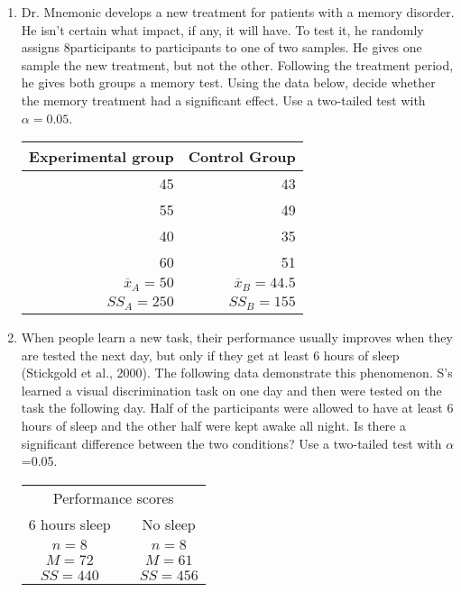 \documentclass[12pt]{article}%
\begin{document}
\mbox{}
\large
\begin{enumerate}

 \item Dr. Mnemonic develops a new treatment for patients with a memory disorder. He isn't certain what impact, if any, it will have. To test it, he randomly assigns 8participants to participants to one of two samples.  He gives one sample the new treatment, but not the other.  Following the treatment period, he gives both groups a memory test.  Using the data below, decide whether the memory treatment had a significant effect. Use a two-tailed test with $\alpha=0.05$.

\begin{table}[h!]
\begin{center}
\begin{tabular}{rr}
Experimental group & Control Group\\
\hline
45 & 43\\
55 & 49\\
40 & 35\\
60 & 51\\
\hline
$\overline{x}_{A}=50$ & $\overline{x}_B=44.5$\\
$SS_A=250$ & $SS_B=155$\\
\end{tabular}
\end{center}
\end{table}

\newpage

\item When people learn a new task, their performance usually improves when they are tested the next day, but only if they get at least 6 hours of sleep (Stickgold et al., 2000).  The following data demonstrate this phenomenon.  S's learned a visual discrimination task on one day and then were tested on the task the following day.  Half of the participants were allowed to have at least 6 hours of sleep and the other half were kept awake all night.  Is there a significant difference between the two conditions?  Use a two-tailed test with $\alpha$=0.05.

\begin{table}[h!]
	\begin{center}
	\begin{tabular}{cp{1cm}c}
		\multicolumn{3}{c}{Performance scores}\\
		6 hours sleep & & No sleep\\
		\hline
		$n=8$ & & $n=8$\\
		$M=72$ & & $M=61$\\
		$SS=440$ & & $SS=456$\\
		\hline
		

\end{tabular}
\end{center}
\end{table}
\end{enumerate}
\end{document}
